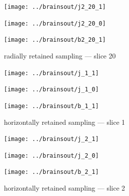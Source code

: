 \documentclass{article}
\begin{document}
\begin{figure}
\begin{centering}

\parbox{\imsize}{\texttt{[image: ../brainsout/j2\_20\_1]}}

\vspace{\vertsep}

\parbox{\imsize}{\texttt{[image: ../brainsout/j2\_20\_0]}}

\vspace{\vertsep}

\parbox{\imsize}{\texttt{[image: ../brainsout/b2\_20\_1]}}

\end{centering}
\caption{radially retained sampling --- slice 20}
\end{figure}


\begin{figure}
\begin{centering}

\parbox{\imsize}{\texttt{[image: ../brainsout/j\_1\_1]}}

\vspace{\vertsep}

\parbox{\imsize}{\texttt{[image: ../brainsout/j\_1\_0]}}

\vspace{\vertsep}

\parbox{\imsize}{\texttt{[image: ../brainsout/b\_1\_1]}}

\end{centering}
\caption{horizontally retained sampling --- slice 1}
\end{figure}


\begin{figure}
\begin{centering}

\parbox{\imsize}{\texttt{[image: ../brainsout/j\_2\_1]}}

\vspace{\vertsep}

\parbox{\imsize}{\texttt{[image: ../brainsout/j\_2\_0]}}

\vspace{\vertsep}

\parbox{\imsize}{\texttt{[image: ../brainsout/b\_2\_1]}}

\end{centering}
\caption{horizontally retained sampling --- slice 2}
\end{figure}
\end{document}
